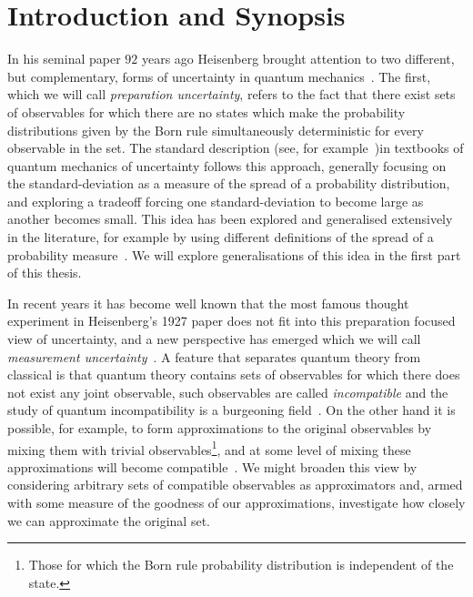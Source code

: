 
\let\textcircled=\pgftextcircled
\chapter{Introduction and Synopsis}
\label{chap:intro}

In his seminal paper $92$ years ago Heisenberg brought attention to two different, but complementary, forms of uncertainty in quantum mechanics~\cite{Heisenberg1927-Wheeler+Zurek}. The first, which we will call \emph{preparation uncertainty}, refers to the fact that there exist sets of observables for which there are no states which make the probability distributions given by the Born rule simultaneously deterministic for every observable in the set. The standard description (see, for example~\cite{griffiths2005introduction})in textbooks of quantum mechanics of uncertainty follows this approach, generally focusing on the standard-deviation as a measure of the spread of a probability distribution, and exploring a tradeoff forcing one standard-deviation to become large as another becomes small. This idea has been explored and generalised extensively in the literature, for example by using different definitions of the spread of a probability measure~\cites{MaassenUffink1988}{doi:10.1063/1.3614503}{doi:10.1063/1.2759831}. We will explore generalisations of this idea in the first part of this thesis.

In recent years it has become well known that the most famous thought experiment in Heisenberg's 1927 paper does not fit into this preparation focused view of uncertainty, and a new perspective has emerged which we will call \emph{measurement uncertainty}~\cites{PhysRevLett.111.160405}{blw-meas-uncertainty}{6773660Werner:2004:URJ:2011593.2011606}. A feature that separates quantum theory from classical is that quantum theory contains sets of observables for which there does not exist any joint observable, such observables are called \emph{incompatible} and the study of quantum incompatibility is a burgeoning field~\cites{Heinosaari_2016}{PhysRevLett.122.130402}{Heinosaari_2017}{PhysRevA.96.052127}. On the other hand it is possible, for example, to form approximations to the original observables by mixing them with trivial observables\footnote{Those for which the Born rule probability distribution is independent of the state.}, and at some level of mixing these approximations will become compatible~\cite{PhysRevA.87.052125}. We might broaden this view by considering arbitrary sets of compatible observables as approximators and, armed with some measure of the goodness of our approximations, investigate how closely we can approximate the original set.



